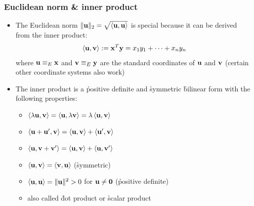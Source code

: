 \begin{frame}
  \frametitle{Euclidean norm \& inner product}

  \begin{itemize}
  \item The Euclidean norm $\norm[2]{\vu} = \sqrt{\sprod{\vu}{\vu}}$ is
    special because it can be derived from the \h{inner product}:
    \[
    \sprod{\vu}{\vv} \coloneq \vx^T \vy = x_1 y_1 + \dots + x_n y_n
    \]
    where $\vu\equiv_E \vx$ and $\vv\equiv_E \vy$ are the standard coordinates
    of $\vu$ and $\vv$ (certain other coordinate systems also work)%
    \pause\gap
  \item The inner product is a \h{positive definite} and \h{symmetric}
    \h{bilinear form} with the following properties:
    \begin{itemize}
    \item $\sprod{\lambda \vu}{\vv} = \sprod{\vu}{\lambda \vv} = \lambda \sprod{\vu}{\vv}$
    \item $\sprod{\vu + \vu'}{\vv} = \sprod{\vu}{\vv} + \sprod{\vu'}{\vv}$
    \item $\sprod{\vu}{\vv + \vv'} = \sprod{\vu}{\vv} + \sprod{\vu}{\vv'}$
    \item $\sprod{\vu}{\vv} = \sprod{\vv}{\vu}$ (\h{symmetric})
    \item $\sprod{\vu}{\vu} = \norm{\vu}^2 > 0$ for $\vu \neq \vnull$ (\h{positive definite})
    \item also called \h{dot product} or \h{scalar product}
    \end{itemize}
  \end{itemize}
\end{frame}

